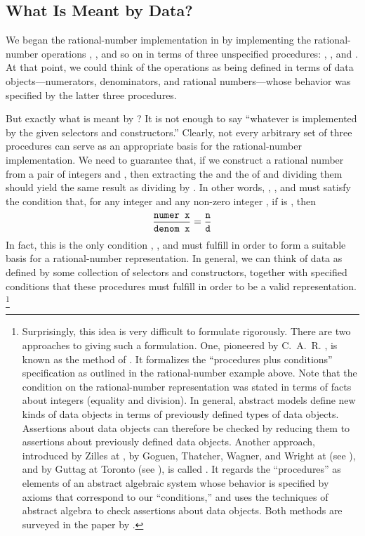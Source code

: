 \subsection{What Is Meant by Data?}
\label{Section 2.1.3}

We began the rational-number implementation in  by implementing the rational-number operations , , and so on in terms of three unspecified procedures:
, , and .
At that point, we could think of the operations as being defined in terms of data objects---numerators, denominators, and rational numbers---whose behavior was specified by the latter three procedures.

But exactly what is meant by ?
It is not enough to say “whatever is implemented by the given selectors and constructors.”
Clearly, not every arbitrary set of three procedures can serve as an appropriate basis for the rational-number implementation.
We need to guarantee that, if we construct a rational number  from a pair of integers  and , then extracting the  and the  of  and dividing them should yield the same result as dividing  by .
In other words, , , and  must satisfy the condition that, for any integer  and any non-zero integer , if  is , then
\[
	\frac{\textup{\texttt{numer x}}}{\textup{\texttt{denom x}}}
	=
	\frac{\textup{\texttt{n}}}{\textup{\texttt{d}}}
\]
In fact, this is the only condition , , and  must fulfill in order to form a suitable basis for a rational-number representation.
In general, we can think of data as defined by some collection of selectors and constructors, together with specified conditions that these procedures must fulfill in order to be a valid representation.%
\footnote{
	Surprisingly, this idea is very difficult to formulate rigorously.
	There are two approaches to giving such a formulation.
	One, pioneered by C.~A.~R.
	, is known as the method of .
	It formalizes the “procedures plus conditions” specification as outlined in the rational-number example above.
	Note that the condition on the rational-number representation was stated in terms of facts about integers (equality and division).
	In general, abstract models define new kinds of data objects in terms of previously defined types of data objects.
	Assertions about data objects can therefore be checked by reducing them to assertions about previously defined data objects.
	Another approach, introduced by Zilles at , by Goguen, Thatcher, Wagner, and Wright at  (see ), and by Guttag at Toronto (see ), is called .
	It regards the “procedures” as elements of an abstract algebraic system whose behavior is specified by axioms that correspond to our “conditions,” and uses the techniques of abstract algebra to check assertions about data objects.
	Both methods are surveyed in the paper by .
}

